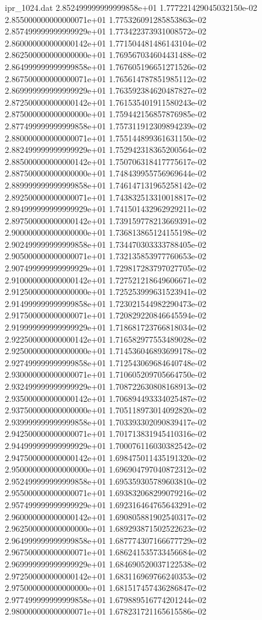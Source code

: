 \begin{filecontents}{ipr_1024.dat}
2.852499999999999858e+01 1.777221429045032150e-02
2.855000000000000071e+01 1.775326091285853863e-02
2.857499999999999929e+01 1.773422373931008572e-02
2.860000000000000142e+01 1.771504481486143104e-02
2.862500000000000000e+01 1.769567034604431488e-02
2.864999999999999858e+01 1.767605196651271526e-02
2.867500000000000071e+01 1.765614787851985112e-02
2.869999999999999929e+01 1.763592384620487827e-02
2.872500000000000142e+01 1.761535401911580243e-02
2.875000000000000000e+01 1.759442156857876985e-02
2.877499999999999858e+01 1.757311912309894239e-02
2.880000000000000071e+01 1.755144899361631150e-02
2.882499999999999929e+01 1.752942318365200564e-02
2.885000000000000142e+01 1.750706318417775617e-02
2.887500000000000000e+01 1.748439955756969644e-02
2.889999999999999858e+01 1.746147131965258142e-02
2.892500000000000071e+01 1.743832513310018817e-02
2.894999999999999929e+01 1.741501432962929211e-02
2.897500000000000142e+01 1.739159778213669391e-02
2.900000000000000000e+01 1.736813865124155198e-02
2.902499999999999858e+01 1.734470303333788405e-02
2.905000000000000071e+01 1.732135853977760653e-02
2.907499999999999929e+01 1.729817283797027705e-02
2.910000000000000142e+01 1.727521218649606671e-02
2.912500000000000000e+01 1.725253999631523941e-02
2.914999999999999858e+01 1.723021544982290473e-02
2.917500000000000071e+01 1.720829220846645594e-02
2.919999999999999929e+01 1.718681723766818034e-02
2.922500000000000142e+01 1.716582977553489028e-02
2.925000000000000000e+01 1.714536046893699178e-02
2.927499999999999858e+01 1.712543069684640748e-02
2.930000000000000071e+01 1.710605209705664750e-02
2.932499999999999929e+01 1.708722630808168913e-02
2.935000000000000142e+01 1.706894493334025487e-02
2.937500000000000000e+01 1.705118973014092820e-02
2.939999999999999858e+01 1.703393302090839417e-02
2.942500000000000071e+01 1.701713831945410316e-02
2.944999999999999929e+01 1.700076116030382542e-02
2.947500000000000142e+01 1.698475011435191320e-02
2.950000000000000000e+01 1.696904797040872312e-02
2.952499999999999858e+01 1.695359305789603810e-02
2.955000000000000071e+01 1.693832068299079216e-02
2.957499999999999929e+01 1.692316464765643291e-02
2.960000000000000142e+01 1.690805881902540317e-02
2.962500000000000000e+01 1.689293871502522623e-02
2.964999999999999858e+01 1.687774307166677729e-02
2.967500000000000071e+01 1.686241535733456684e-02
2.969999999999999929e+01 1.684690520037122538e-02
2.972500000000000142e+01 1.683116969766240353e-02
2.975000000000000000e+01 1.681517457436286847e-02
2.977499999999999858e+01 1.679889516774201244e-02
2.980000000000000071e+01 1.678231721165615586e-02

\end{filecontents}
